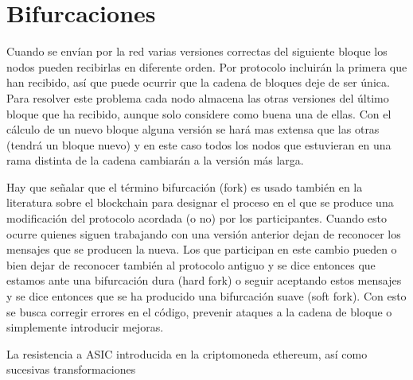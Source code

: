 \section{Bifurcaciones}\label{cap3:bifurcaciones}
Cuando se envían por la red varias versiones correctas del siguiente bloque los nodos pueden recibirlas en diferente orden. Por protocolo incluirán la primera que han recibido, así que puede ocurrir que la cadena de bloques deje de ser única. Para resolver este problema cada nodo almacena las otras versiones del último bloque que ha recibido, aunque solo considere como buena una de ellas. Con el cálculo de un nuevo bloque alguna versión se hará mas extensa que las otras (tendrá un bloque nuevo) y en este caso todos los nodos que estuvieran en una rama distinta de la cadena cambiarán a la versión más larga.

Hay que señalar que el término bifurcación (fork) es usado también en la literatura sobre el blockchain para designar el proceso en el que se produce una modificación del protocolo acordada (o no) por los participantes. Cuando esto ocurre quienes siguen trabajando con una versión anterior dejan de reconocer los mensajes que se producen la nueva. Los que participan en este cambio pueden o bien dejar de reconocer también al protocolo antiguo y se dice entonces que estamos ante una bifurcación dura (hard fork) o seguir aceptando estos mensajes y se dice entonces que se ha producido una bifurcación suave (soft fork). Con esto se busca corregir errores en el código, prevenir ataques a la cadena de bloque o simplemente introducir mejoras.

La resistencia a ASIC introducida en la criptomoneda ethereum, así como sucesivas transformaciones 


